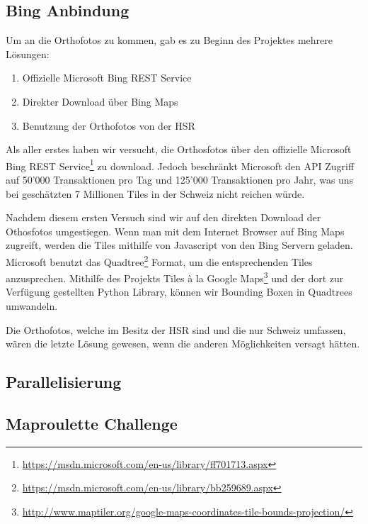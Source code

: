 \newpage
\subsection{Bing Anbindung}
Um an die Orthofotos zu kommen, gab es zu Beginn des Projektes mehrere Lösungen:
\begin{enumerate}
	\item Offizielle Microsoft Bing REST Service
	\item Direkter Download über Bing Maps
	\item Benutzung der Orthofotos von der HSR
\end{enumerate}

Als aller erstes haben wir versucht, die Orthosfotos über den offizielle Microsoft Bing REST Service\footnote{\url{https://msdn.microsoft.com/en-us/library/ff701713.aspx}} zu download. Jedoch beschränkt Microsoft den API Zugriff auf 50'000 Transaktionen pro Tag und 125'000 Transaktionen pro Jahr, was uns bei geschätzten 7 Millionen Tiles in der Schweiz nicht reichen würde.

Nachdem diesem ersten Versuch sind wir auf den direkten Download der Othosfotos umgestiegen. Wenn man mit dem Internet Browser auf Bing Maps zugreift, werden die Tiles mithilfe von Javascript von den Bing Servern geladen. Microsoft benutzt das Quadtree\footnote{\url{https://msdn.microsoft.com/en-us/library/bb259689.aspx}} Format, um die entsprechenden Tiles anzusprechen. Mithilfe des Projekts Tiles à la Google Maps\footnote{\url{http://www.maptiler.org/google-maps-coordinates-tile-bounds-projection/}} und der dort zur Verfügung gestellten Python Library, können wir Bounding Boxen in Quadtrees umwandeln.

Die Orthofotos, welche im Besitz der HSR sind und die nur Schweiz umfassen, wären die letzte Lösung gewesen, wenn die anderen Möglichkeiten versagt hätten.


\subsection{Parallelisierung}
\subsection{Maproulette Challenge}
